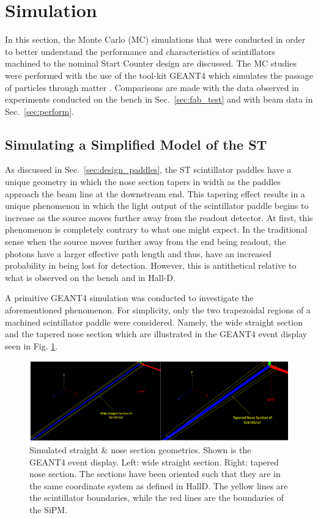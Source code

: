 \section{Simulation} \label{sec:sim}

In this section, the Monte Carlo (MC) simulations that were conducted in order to better understand the performance and characteristics of scintillators machined to the nominal \gx{} Start Counter design are discussed.  The MC studies were performed with the use of the tool-kit GEANT4 which simulates the passage of particles through matter \cite{geant4_website}.  Comparisons are made with the data observed in experiments conducted on the bench in Sec.~\ref{sec:fab_test} and with beam data in Sec.~\ref{sec:perform}.  

\subsection{Simulating a Simplified Model of the ST} \label{sec:sim_simple}

As discussed in Sec.~\ref{sec:design_paddles}, the ST scintillator paddles have a unique geometry in which the nose section tapers in width as the paddles approach the beam line at the downstream end.  This tapering effect results in a unique phenomenon in which the light output of the scintillator paddle begins to increase as the source moves further away from the readout detector.  At first, this phenomenon is completely contrary to what one might expect. In the traditional sense when the source moves further away from the end being readout, the photons have a larger effective path length and thus, have an increased probability in being lost for detection.  However, this is antithetical relative to what is observed on the bench and in Hall-D.

A primitive GEANT4 simulation was conducted to investigate the aforementioned phenomenon. For simplicity, only the two trapezoidal regions of a machined scintillator paddle were considered.  Namely, the wide straight section and the tapered nose section which are illustrated in the GEANT4 event display  seen in Fig. \ref{fig:beam_off}.
	\begin{figure}[!htb]
	\centering
	\includegraphics[width=1.0\columnwidth]{simulation/figs/beam_off}
	\caption{Simulated straight \& nose section geometries.  Shown is the GEANT4 event display.  Left: wide straight section.  Right: tapered nose section.  The sections have been oriented such that they are in the same coordinate system as defined in HallD.  The yellow lines are the scintillator boundaries, while the red lines are the boundaries of the SiPM.}
	\label{fig:beam_off}
	\end{figure}  

